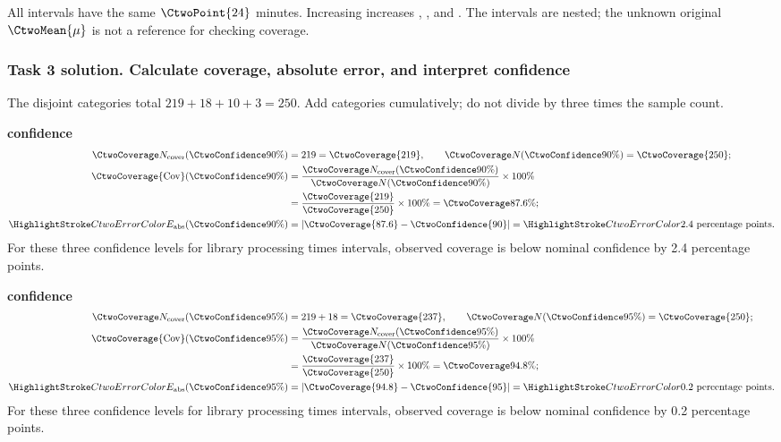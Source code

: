 All intervals have the same  $\CtwoPoint{24}$ minutes. Increasing  increases , , and . The intervals are nested; the unknown original $\CtwoMean{\mu}$ is not a reference for checking coverage.
\par\vspace{3mm}
\clearpage
\subsubsection*{Task 3 solution. Calculate coverage, absolute error, and interpret confidence}
\label{sol:c2-compare-three-c}
The disjoint categories total $219+18+10+3=250$. Add categories cumulatively; do not divide by three times the sample count.

\textbf{ confidence}\nopagebreak[4]
\begin{align*}
\CtwoCoverCount(\CtwoConfidence{90\%})&=219=\CtwoCoverage{219},
\qquad\CtwoTotalCount(\CtwoConfidence{90\%})=\CtwoCoverage{250};\\
\CtwoCoverage{\mathrm{Cov}}(\CtwoConfidence{90\%})
&=\frac{\CtwoCoverCount(\CtwoConfidence{90\%})}{\CtwoTotalCount(\CtwoConfidence{90\%})}\times100\%
\\
&=\frac{\CtwoCoverage{219}}{\CtwoCoverage{250}}\times100\%=\CtwoCoverage{87.6\%};\\
\CtwoError{E_{\rm abs}}(\CtwoConfidence{90\%})
&=\left|\CtwoCoverage{87.6}-\CtwoConfidence{90}\right|=\CtwoError{2.4}\ \text{percentage points}.
\end{align*}
For these three confidence levels for library processing times intervals, observed coverage is below nominal confidence by 2.4 percentage points.

\textbf{ confidence}\nopagebreak[4]
\begin{align*}
\CtwoCoverCount(\CtwoConfidence{95\%})&=219+18=\CtwoCoverage{237},
\qquad\CtwoTotalCount(\CtwoConfidence{95\%})=\CtwoCoverage{250};\\
\CtwoCoverage{\mathrm{Cov}}(\CtwoConfidence{95\%})
&=\frac{\CtwoCoverCount(\CtwoConfidence{95\%})}{\CtwoTotalCount(\CtwoConfidence{95\%})}\times100\%
\\
&=\frac{\CtwoCoverage{237}}{\CtwoCoverage{250}}\times100\%=\CtwoCoverage{94.8\%};\\
\CtwoError{E_{\rm abs}}(\CtwoConfidence{95\%})
&=\left|\CtwoCoverage{94.8}-\CtwoConfidence{95}\right|=\CtwoError{0.2}\ \text{percentage points}.
\end{align*}
For these three confidence levels for library processing times intervals, observed coverage is below nominal confidence by 0.2 percentage points.

